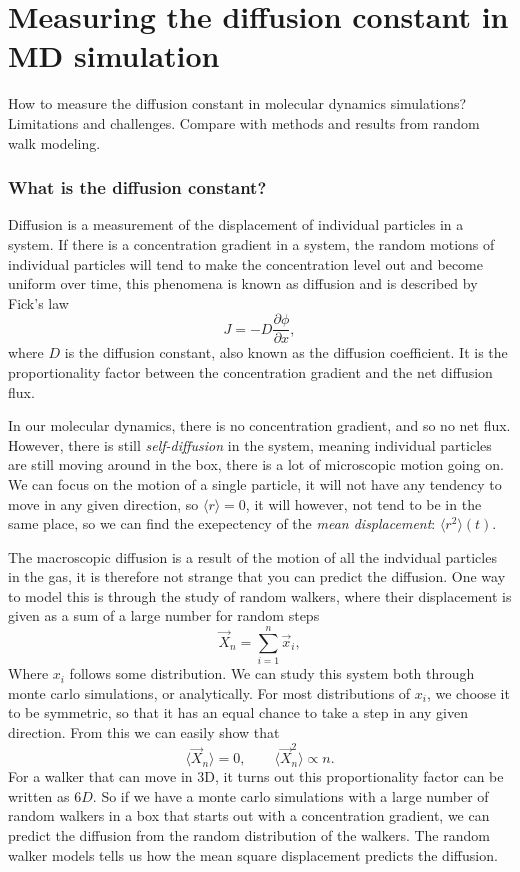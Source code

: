 \documentclass[a4paper, 11pt, notitlepage, english]{article}
\newcommand{\p}{\partial}
\begin{document}

\section{Measuring the diffusion constant in MD simulation}

How to measure the diffusion constant in molecular dynamics simulations? Limitations and challenges. Compare with methods and results from random walk modeling.

\subsubsection*{What is the diffusion constant?}

Diffusion is a measurement of the displacement of individual particles in a system. If there is a concentration gradient in a system, the random motions of individual particles will tend to make the concentration level out and become uniform over time, this phenomena is known as diffusion and is described by Fick's law
$$J = -D\frac{\p \phi}{\p x},$$
where $D$ is the diffusion constant, also known as the diffusion coefficient. It is the proportionality factor between the concentration gradient and the net diffusion flux.

In our molecular dynamics, there is no concentration gradient, and so no net flux. However, there is still \emph{self-diffusion} in the system, meaning individual particles are still moving around in the box, there is a lot of microscopic motion going on. We can focus on the motion of a single particle, it will not have any tendency to move in any given direction, so $\langle r \rangle = 0$, it will however, not tend to be in the same place, so we can find the exepectency of the \emph{mean displacement}: $\langle r^2 \rangle(t)$. 

The macroscopic diffusion is a result of the motion of all the indvidual particles in the gas, it is therefore not strange that you can predict the diffusion. One way to model this is through the study of random walkers, where their displacement is given as a sum of a large number for random steps
$$\vec{X}_n = \sum_{i=1}^n \vec{x}_i,$$
Where $x_i$ follows some distribution. We can study this system both through monte carlo simulations, or analytically. For most distributions of $x_i$, we choose it to be symmetric, so that it has an equal chance to take a step in any given direction. From this we can easily show that
$$\langle \vec{X}_n \rangle = 0, \qquad \langle \vec{X}_n^2 \rangle \propto n.$$
For a walker that can move in 3D, it turns out this proportionality factor can be written as $6D$. So if we have a monte carlo simulations with a large number of random walkers in a box that starts out with a concentration gradient, we can predict the diffusion from the random distribution of the walkers. The random walker models tells us how the mean square displacement predicts the diffusion.
\end{document}
